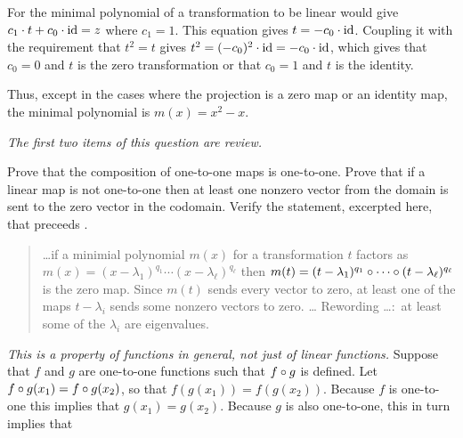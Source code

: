\begin{exercises}
\begin{answer}
      For the minimal polynomial of a transformation to be linear would give 
      $c_1\cdot t+c_0\cdot\mbox{id}=z$ where $c_1=1$.
      This equation gives $t=-c_0\cdot \mbox{id}$.
      Coupling it with the requirement that $t^2=t$ gives
      $t^2=(-c_0)^2\cdot\mbox{id}=-c_0\cdot\mbox{id}$, which gives that
      $c_0=0$ and $t$ is the zero transformation or that $c_0=1$ and
      $t$ is the identity.       

      Thus, except in the cases where the projection is a zero map or an
      identity map, the minimal polynomial is $m(x)=x^2-x$. 
    \end{answer}
  \item \label{exer:SomeRootsMinPolyAreEigs}
    \textit{The first two items of this question are review.}
    \begin{exparts}
      \partsitem Prove that the composition of one-to-one maps is
        one-to-one.
      \partsitem Prove that if a linear map is not one-to-one then
        at least one nonzero vector from the domain is sent to the 
        zero vector in the codomain.
      \partsitem Verify the statement, excerpted here, that
         preceeds .
         \begin{quotation}
           \noindent \ldots if a minimial polynomial $m(x)$ for a 
           transformation $t$ factors as
           $m(x)=(x-\lambda_1)^{q_1}\cdots (x-\lambda_\ell)^{q_\ell}$
           then 
           \( m(t)=(t-\lambda_1)^{q_1}\mathbin\circ \cdots\mathbin\circ 
                                       (t-\lambda_\ell)^{q_\ell} \) 
           is the zero map. 
           Since \( m(t) \) sends every vector to zero, at least
           one of the maps \( t-\lambda_i \)  sends some
           nonzero vectors to zero.
           \ldots
           Rewording \ldots:~at least some of the 
           \( \lambda_i \) are eigenvalues.
        \end{quotation}
    \end{exparts}
    \begin{answer}
      \begin{exparts}
       \partsitem \textit{This is a property of functions in general,
          not just of linear functions.}
          Suppose that $f$ and $g$ are one-to-one functions such that
          $f\mathbin\circ g$ is defined.
          Let $f\mathbin\circ g(x_1)=f\mathbin\circ g(x_2)$, so that
          $f(g(x_1))=f(g(x_2))$.
          Because $f$ is one-to-one this implies that $g(x_1)=g(x_2)$.
          Because $g$ is also one-to-one, this in turn implies that

\end{exparts}
\end{answer}
\end{exercises}
